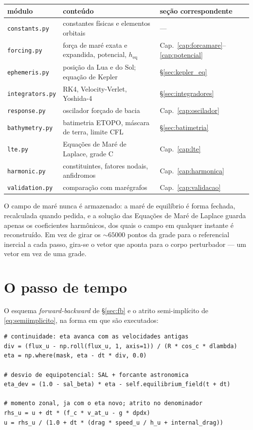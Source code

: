 \documentclass[11pt,a4paper,oneside]{report}
\theoremstyle{definition}
\theoremstyle{plain}
\theoremstyle{remark}
\begin{document}
\begin{table}[H]
\centering
\small
\begin{tabular}{@{}lll@{}}
\toprule
módulo & conteúdo & seção correspondente \\
\midrule
\texttt{constants.py}   & constantes físicas e elementos orbitais & --- \\
\texttt{forcing.py}     & força de maré exata e expandida, potencial, $h_{\text{eq}}$ & Cap.~\ref{cap:forcamare}--\ref{cap:potencial} \\
\texttt{ephemeris.py}   & posição da Lua e do Sol; equação de Kepler & \S\ref{sec:kepler_eq} \\
\texttt{integrators.py} & RK4, Velocity-Verlet, Yoshida-4 & \S\ref{sec:integradores} \\
\texttt{response.py}    & oscilador forçado de bacia & Cap.~\ref{cap:oscilador} \\
\texttt{bathymetry.py}  & batimetria ETOPO, máscara de terra, limite CFL & \S\ref{sec:batimetria} \\
\texttt{lte.py}         & Equações de Maré de Laplace, grade C & Cap.~\ref{cap:lte} \\
\texttt{harmonic.py}    & constituintes, fatores nodais, anfidromos & Cap.~\ref{cap:harmonica} \\
\texttt{validation.py}  & comparação com marégrafos & Cap.~\ref{cap:validacao} \\
\bottomrule
\end{tabular}
\end{table}

O campo de maré nunca é armazenado: a maré de equilíbrio é forma fechada,
recalculada quando pedida, e a solução das Equações de Maré de Laplace guarda
apenas os coeficientes harmônicos, dos quais o campo em qualquer instante é
reconstruído. Em vez de girar os $\sim\!\num{65000}$ pontos da grade para o
referencial inercial a cada passo, gira-se o vetor que aponta para o corpo
perturbador — um vetor em vez de uma grade.

\section*{O passo de tempo}

O esquema \emph{forward-backward} de \S\ref{sec:fb} e o atrito semi-implícito
de \eqref{eq:semiimplicito}, na forma em que são executados:

\begin{lstlisting}[numbers=none]
# continuidade: eta avanca com as velocidades antigas
div = (flux_u - np.roll(flux_u, 1, axis=1)) / (R * cos_c * dlambda)
eta = np.where(mask, eta - dt * div, 0.0)

# desvio de equipotencial: SAL + forcante astronomica
eta_dev = (1.0 - sal_beta) * eta - self.equilibrium_field(t + dt)

# momento zonal, ja com o eta novo; atrito no denominador
rhs_u = u + dt * (f_c * v_at_u - g * dpdx)
u = rhs_u / (1.0 + dt * (drag * speed_u / h_u + internal_drag))
\end{lstlisting}
\end{document}
